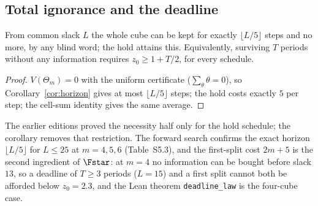 \subsection{Total ignorance and the deadline}
\begin{proposition}\label{prop:deadline}
From common slack $L$ the whole cube can be kept for exactly $\lfloor L/5\rfloor$ steps and no more, by any blind word; the hold attains this. Equivalently, surviving $T$ periods without any information requires $z_0\ge1+T/2$, for every schedule.
\end{proposition}
\begin{proof}
$V(\Theta_m)=0$ with the uniform certificate ($\sum_\theta\theta=0$), so Corollary~\ref{cor:horizon} gives at most $\lfloor L/5\rfloor$ steps; the hold costs exactly $5$ per step; the cell-sum identity gives the same average.
\end{proof}
The earlier editions proved the necessity half only for the hold schedule; the corollary removes that restriction. The forward search confirms the exact horizon $\lfloor L/5\rfloor$ for $L\le25$ at $m=4,5,6$ (Table~S5.3), and the first-split cost $2m+5$ is the second ingredient of $\Fstar$: at $m=4$ no information can be bought before slack $13$, so a deadline of $T\ge3$ periods ($L=15$) and a first split cannot both be afforded below $z_0=2.3$, and the Lean theorem \texttt{deadline\_law} is the four-cube case.
